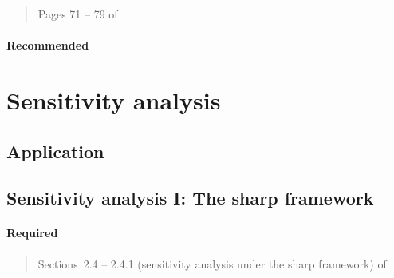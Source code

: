 \documentclass[12pt]{article}
\begin{document}
\begin{verse} Pages 71 -- 79 of  \end{verse}

\begin{verse}  \end{verse}

\begin{verse}  \end{verse}

\paragraph*{Recommended}

\begin{verse}  \end{verse}

\begin{verse}  \end{verse}

\section{Sensitivity analysis}

\subsection*{Application}

\begin{verse}  \end{verse}

\begin{verse}  \end{verse}

\subsection{Sensitivity analysis I: The sharp framework}

\paragraph*{Required}

\begin{verse} Sections~2.4 -- 2.4.1 (sensitivity analysis under the sharp framework) of  \end{verse}
\end{document}

